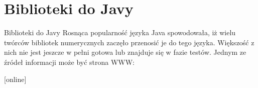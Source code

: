\section{Biblioteki do Javy}
	\begin{frame}{Biblioteki do Javy}
		Rosnąca popularność języka Java spowodowała, iż wielu twórców bibliotek numerycznych zaczęło przenosić je do tego języka. Większość z nich nie jest jeszcze w pełni gotowa lub znajduje się w fazie testów. Jednym ze źródeł informacji może być strona WWW:
		\begin{thebibliography}{9}
		\end{thebibliography}
	\end{frame}
